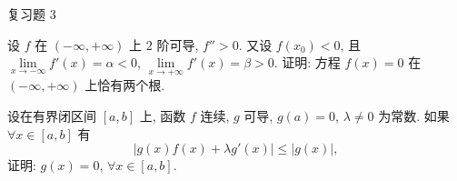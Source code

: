 \begin{exblock}{复习题 3}
    \item 设 $f$ 在 $(-\infty,+\infty)$ 上 $2$ 阶可导, $f''>0$. 又设 $f(x_{0})<0$, 且 $\lim\limits_{x\to-\infty}f'(x)=\alpha<0$, $\lim\limits_{x\to+\infty}f'(x)=\beta>0$. 证明: 方程 $f(x)=0$ 在 $(-\infty,+\infty)$ 上恰有两个根.

    \item 设在有界闭区间 $[a,b]$ 上, 函数 $f$ 连续, $g$ 可导, $g(a)=0$, $\lambda\neq 0$ 为常数. 如果 $\forall x\in[a,b]$ 有
    \[
    |g(x)f(x)+\lambda g'(x)|\leqslant |g(x)|,
\]
    证明: $g(x)=0$, $\forall x\in[a,b]$.
\end{exblock}
